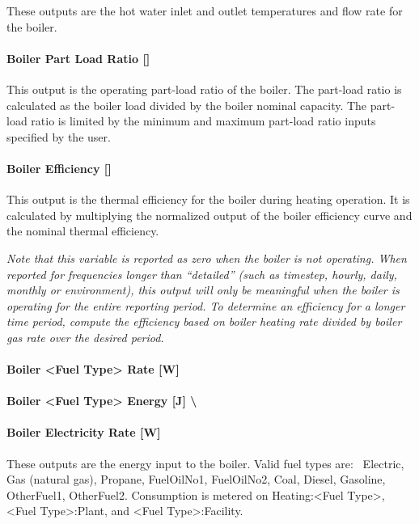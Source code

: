 These outputs are the hot water inlet and outlet temperatures and flow rate for the boiler.

\paragraph{Boiler Part Load Ratio {[]}}\label{boiler-part-load-ratio}

This output is the operating part-load ratio of the boiler. The part-load ratio is calculated as the boiler load divided by the boiler nominal capacity. The part-load ratio is limited by the minimum and maximum part-load ratio inputs specified by the user.

\paragraph{Boiler Efficiency {[]}}\label{boiler-efficiency}

This output is the thermal efficiency for the boiler during heating operation. It is calculated by multiplying the normalized output of the boiler efficiency curve and the nominal thermal efficiency.

\emph{Note that this variable is reported as zero when the boiler is not operating. When reported for frequencies longer than ``detailed'' (such as timestep, hourly, daily, monthly or environment), this output will only be meaningful when the boiler is operating for the entire reporting period. To determine an efficiency for a longer time period, compute the efficiency based on boiler heating rate divided by boiler gas rate over the desired period.}

\paragraph{Boiler \textless{}Fuel Type\textgreater{} Rate {[}W{]}}\label{boiler-fuel-type-rate-w}

\paragraph{Boiler \textless{}Fuel Type\textgreater{} Energy {[}J{]} \textbackslash{}}\label{boiler-fuel-type-energy-j}

\paragraph{Boiler Electricity Rate {[}W{]}}\label{boiler-electric-power-w}

These outputs are the energy input to the boiler. Valid fuel types are:~ Electric, Gas (natural gas), Propane, FuelOilNo1, FuelOilNo2, Coal, Diesel, Gasoline, OtherFuel1, OtherFuel2. Consumption is metered on Heating:\textless{}Fuel Type\textgreater{}, \textless{}Fuel Type\textgreater{}:Plant, and \textless{}Fuel Type\textgreater{}:Facility.

